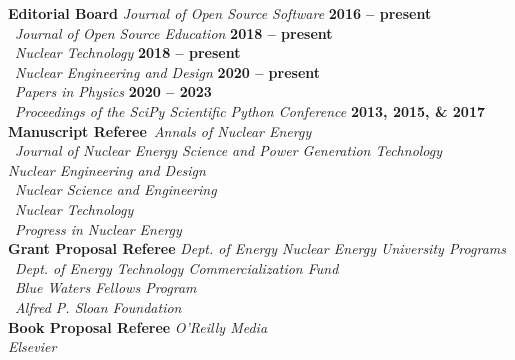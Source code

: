 \documentclass[margin,line]{resume}
\begin{document}
\begin{resume}
    \textbf{Editorial Board} \hfill \emph{Journal of Open Source Software} \textbf{2016 -- present}\\%
     \mbox{}~\hfill \emph{Journal of Open Source Education} \textbf{2018 -- present}\\%
                    \mbox{}~\hfill \emph{Nuclear Technology} \textbf{2018 -- present}\vspace{2mm}\\%
                    \mbox{}~\hfill \emph{Nuclear Engineering and Design} \textbf{2020 -- present}\vspace{2mm}\\%
                    \mbox{}~\hfill \emph{Papers in Physics} \textbf{2020 -- 2023}\vspace{2mm}\\%
                    \mbox{}~\hfill \emph{Proceedings of the SciPy Scientific Python Conference} \textbf{2013, 2015, \& 2017}\vspace{2mm}\\%
    \textbf{Manuscript Referee}~\hfill\emph{Annals of Nuclear Energy}\\%
                            \mbox{}~\hfill \emph{Journal of Nuclear Energy Science and Power Generation Technology} \\%
                            \mbox{}\hfill \emph{Nuclear Engineering and Design}\\%
                            \mbox{}~\hfill\emph{Nuclear Science and Engineering}\\%
                            \mbox{}~\hfill\emph{Nuclear Technology}\\%
                            \mbox{}~\hfill\emph{Progress in Nuclear Energy}\vspace{2mm}\\%
    \textbf{Grant Proposal Referee} \hfill \emph{Dept. of Energy Nuclear Energy University Programs}\\%
                            \mbox{}~\hfill\emph{Dept. of Energy Technology Commercialization Fund}\\%
                            \mbox{}~\hfill\emph{Blue Waters Fellows Program}\vspace{2mm}\\%
                            \mbox{}~\hfill\emph{Alfred P. Sloan Foundation}\vspace{2mm}\\%
    \textbf{Book Proposal Referee} \hfill\emph{O'Reilly Media}\\%
                            \mbox{}\hfill\emph{Elsevier}\vspace{2mm}\\%

\end{resume}
\end{document}
